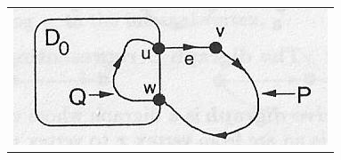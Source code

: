 
	\begin{table}[h!] %
		\centering %
			\begin{tabular}{c}
				\includegraphics[scale=0.7]{./otros/figura3.jpg} 

				\end{tabular}
				\caption{} %
				\label{} %
	\end{table}

